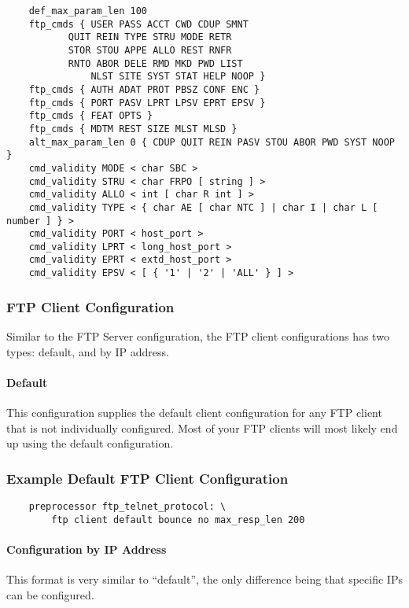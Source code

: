 \documentclass[english]{report}
\begin{document}
\begin{verbatim}
    def_max_param_len 100
    ftp_cmds { USER PASS ACCT CWD CDUP SMNT 
	       QUIT REIN TYPE STRU MODE RETR 
	       STOR STOU APPE ALLO REST RNFR 
	       RNTO ABOR DELE RMD MKD PWD LIST 
               NLST SITE SYST STAT HELP NOOP } 
    ftp_cmds { AUTH ADAT PROT PBSZ CONF ENC } 
    ftp_cmds { PORT PASV LPRT LPSV EPRT EPSV } 
    ftp_cmds { FEAT OPTS } 
    ftp_cmds { MDTM REST SIZE MLST MLSD } 
    alt_max_param_len 0 { CDUP QUIT REIN PASV STOU ABOR PWD SYST NOOP } 
    cmd_validity MODE < char SBC > 
    cmd_validity STRU < char FRPO [ string ] > 
    cmd_validity ALLO < int [ char R int ] > 
    cmd_validity TYPE < { char AE [ char NTC ] | char I | char L [ number ] } > 
    cmd_validity PORT < host_port > 
    cmd_validity LPRT < long_host_port > 
    cmd_validity EPRT < extd_host_port > 
    cmd_validity EPSV < [ { '1' | '2' | 'ALL' } ] >
\end{verbatim}

\subsubsection{FTP Client Configuration}

Similar to the FTP Server configuration, the FTP client configurations has two
types: default, and by IP address.

\paragraph{Default}

This configuration supplies the default client configuration for any FTP client
that is not individually configured.  Most of your FTP clients will most likely
end up using the default configuration.

\subsubsection{Example Default FTP Client Configuration}
\begin{verbatim}
    preprocessor ftp_telnet_protocol: \
        ftp client default bounce no max_resp_len 200
\end{verbatim}

\paragraph{Configuration by IP Address}

This format is very similar to ``default'', the only difference being that
specific IPs can be configured.
\end{document}
